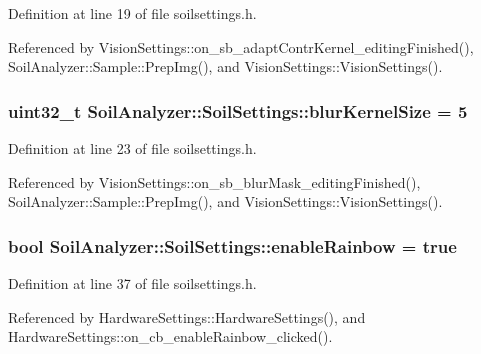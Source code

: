 Definition at line 19 of file soilsettings.\+h.



Referenced by Vision\+Settings\+::on\+\_\+sb\+\_\+adapt\+Contr\+Kernel\+\_\+editing\+Finished(), Soil\+Analyzer\+::\+Sample\+::\+Prep\+Img(), and Vision\+Settings\+::\+Vision\+Settings().

\hypertarget{class_soil_analyzer_1_1_soil_settings_afa46542d30045e00fadbdd5a6ab9a1e1}{}
\subsubsection[{blur\+Kernel\+Size}]{\setlength{\rightskip}{0pt plus 5cm}uint32\+\_\+t Soil\+Analyzer\+::\+Soil\+Settings\+::blur\+Kernel\+Size = 5}\label{class_soil_analyzer_1_1_soil_settings_afa46542d30045e00fadbdd5a6ab9a1e1}


Definition at line 23 of file soilsettings.\+h.



Referenced by Vision\+Settings\+::on\+\_\+sb\+\_\+blur\+Mask\+\_\+editing\+Finished(), Soil\+Analyzer\+::\+Sample\+::\+Prep\+Img(), and Vision\+Settings\+::\+Vision\+Settings().

\hypertarget{class_soil_analyzer_1_1_soil_settings_a9ece0b96eb8614a497fba3a19d8b4da1}{}
\subsubsection[{enable\+Rainbow}]{\setlength{\rightskip}{0pt plus 5cm}bool Soil\+Analyzer\+::\+Soil\+Settings\+::enable\+Rainbow = true}\label{class_soil_analyzer_1_1_soil_settings_a9ece0b96eb8614a497fba3a19d8b4da1}


Definition at line 37 of file soilsettings.\+h.



Referenced by Hardware\+Settings\+::\+Hardware\+Settings(), and Hardware\+Settings\+::on\+\_\+cb\+\_\+enable\+Rainbow\+\_\+clicked().

\hypertarget{class_soil_analyzer_1_1_soil_settings_ad831e13b61fc2097219bbf7252f045d5}{}
